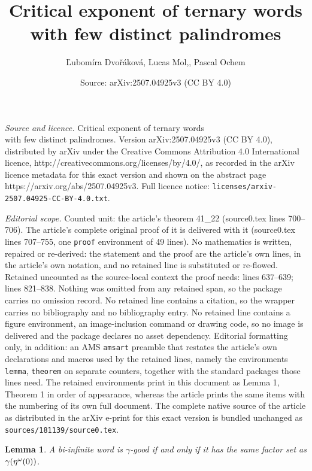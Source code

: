 \documentclass[10pt,a4paper]{amsart}
\title{Critical exponent of ternary words{ } \\ with few distinct palindromes}
\author{\v{L}ubom\'ira Dvo\v{r}\'akov\'a, Lucas Mol,, Pascal Ochem}
\date{Source: arXiv:2507.04925v3 (CC BY 4.0)}
\newtheorem{lemma}{Lemma}
\newcommand{\normaltt}[1]{\normalfont\texttt{#1}}
\begin{document}
\maketitle

\noindent\emph{Source and licence.} Critical exponent of ternary words{ } \\ with few distinct palindromes. Version arXiv:2507.04925v3 (CC BY 4.0), distributed by arXiv under the Creative Commons Attribution 4.0 International licence, http://creativecommons.org/licenses/by/4.0/, as recorded in the arXiv licence metadata for this exact version and shown on the abstract page https://arxiv.org/abs/2507.04925v3. Full licence notice: \texttt{licenses/arxiv-2507.04925-CC-BY-4.0.txt}.\par\smallskip

\noindent\textit{Editorial scope.} Counted unit: the article's theorem 41\_22 (source0.tex lines 700--706). The article's complete original proof of it is delivered with it (source0.tex lines 707--755, one \texttt{proof} environment of 49 lines). No mathematics is written, repaired or re-derived: the statement and the proof are the article's own lines, in the article's own notation, and no retained line is substituted or re-flowed.  Retained uncounted as the source-local context the proof needs: lines 637--639; lines 821--838.  Nothing was omitted from any retained span, so the package carries no omission record.  No retained line contains a citation, so the wrapper carries no bibliography and no bibliography entry.  No retained line contains a figure environment, an image-inclusion command or drawing code, so no image is delivered and the package declares no asset dependency.  Editorial formatting only, in addition: an AMS \texttt{amsart} preamble that restates the article's own declarations and macros used by the retained lines, namely the environments \texttt{lemma}, \texttt{theorem} on separate counters, together with the standard packages those lines need.  The retained environments print in this document as Lemma 1, Theorem 1 in order of appearance, whereas the article prints the same items with the numbering of its own full document.  The complete native source of the article as distributed in the arXiv e-print for this exact version is bundled unchanged as \texttt{sources/181139/source0.tex}.
\begin{lemma}\label{ggood}
A bi-infinite word is $\gamma$-good if and only if it has the same factor set as $\gamma(\eta^\omega(\normaltt{0}))$.
\end{lemma}
\end{document}
